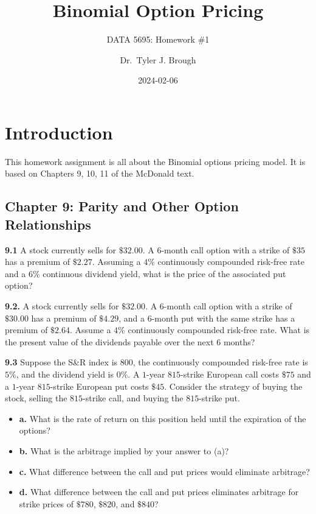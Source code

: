 \documentclass[
  letterpaper,
  DIV=11,
  numbers=noendperiod]{scrartcl}
\title{Binomial Option Pricing}
\subtitle{DATA 5695: Homework \#1}
\author{Dr.~Tyler J. Brough}
\date{2024-02-06}
\begin{document}
\maketitle
\ifdefined\Shaded\renewenvironment{Shaded}{\begin{tcolorbox}[boxrule=0pt, enhanced, frame hidden, interior hidden, breakable, borderline west={3pt}{0pt}{shadecolor}, sharp corners]}{\end{tcolorbox}}\fi

\section{Introduction}\label{introduction}

This homework assignment is all about the Binomial options pricing
model. It is based on Chapters 9, 10, 11 of the McDonald text.

\subsection{Chapter 9: Parity and Other Option
Relationships}\label{chapter-9-parity-and-other-option-relationships}

\textbf{9.1} A stock currently sells for \(\$32.00\). A \(6\)-month call
option with a strike of \(\$35\) has a premium of \(\$2.27\). Assuming a
\(4\%\) continuously compounded risk-free rate and a \(6\%\) continuous
dividend yield, what is the price of the associated put option?

\textbf{9.2.} A stock currently sells for \(\$32.00\). A \(6\)-month
call option with a strike of \(\$30.00\) has a premium of \(\$4.29\),
and a \(6\)-month put with the same strike has a premium of \(\$2.64\).
Assume a \(4\%\) continuously compounded risk-free rate. What is the
present value of the dividends payable over the next \(6\) months?

\textbf{9.3} Suppose the S\&R index is \(800\), the continuously
compounded risk-free rate is \(5\%\), and the dividend yield is \(0\%\).
A \(1\)-year \(815\)-strike European call costs \(\$75\) and a
\(1\)-year \(815\)-strike European put costs \(\$45\). Consider the
strategy of buying the stock, selling the \(815\)-strike call, and
buying the \(815\)-strike put.

\begin{itemize}
\item
  \textbf{a.} What is the rate of return on this position held until the
  expiration of the options?
\item
  \textbf{b.} What is the arbitrage implied by your answer to (a)?
\item
  \textbf{c.} What difference between the call and put prices would
  eliminate arbitrage?
\item
  \textbf{d.} What difference between the call and put prices eliminates
  arbitrage for strike prices of \(\$780\), \(\$820\), and \(\$840\)?
\end{itemize}
\end{document}
